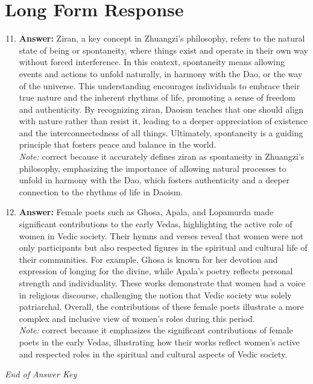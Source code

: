 \documentclass[12pt]{article}
\begin{document}
\section*{Long Form Response}
\begin{enumerate}[label=\arabic*.]
\setcounter{enumi}{10}
\item \textbf{Answer:} Ziran, a key concept in Zhuangzi's philosophy, refers to the natural state of being or spontaneity, where things exist and operate in their own way without forced interference. In this context, spontaneity means allowing events and actions to unfold naturally, in harmony with the Dao, or the way of the universe. This understanding encourages individuals to embrace their true nature and the inherent rhythms of life, promoting a sense of freedom and authenticity. By recognizing ziran, Daoism teaches that one should align with nature rather than resist it, leading to a deeper appreciation of existence and the interconnectedness of all things. Ultimately, spontaneity is a guiding principle that fosters peace and balance in the world.
\\ \textit{Note:} correct because it accurately defines ziran as spontaneity in Zhuangzi's philosophy, emphasizing the importance of allowing natural processes to unfold in harmony with the Dao, which fosters authenticity and a deeper connection to the rhythms of life in Daoism.
\item \textbf{Answer:} Female poets such as Ghosa, Apala, and Lopamurda made significant contributions to the early Vedas, highlighting the active role of women in Vedic society. Their hymns and verses reveal that women were not only participants but also respected figures in the spiritual and cultural life of their communities. For example, Ghosa is known for her devotion and expression of longing for the divine, while Apala's poetry reflects personal strength and individuality. These works demonstrate that women had a voice in religious discourse, challenging the notion that Vedic society was solely patriarchal. Overall, the contributions of these female poets illustrate a more complex and inclusive view of women's roles during this period.
\\ \textit{Note:} correct because it emphasizes the significant contributions of female poets in the early Vedas, illustrating how their works reflect women's active and respected roles in the spiritual and cultural aspects of Vedic society.
\end{enumerate}

\vfill
\noindent\textit{End of Answer Key}
\end{document}
